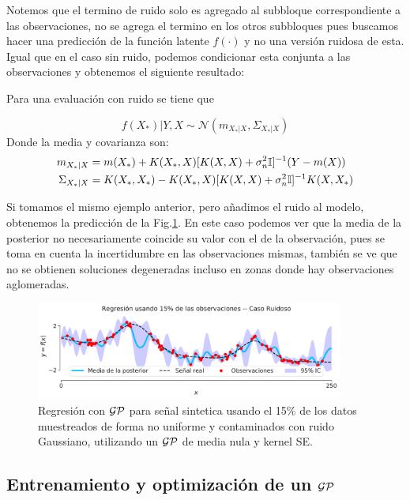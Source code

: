 Notemos que el termino de ruido solo es agregado al subbloque correspondiente a las observaciones, no se agrega el termino en los otros subbloques pues buscamos hacer una predicción de la función latente $f(\cdot)$ y no una versión ruidosa de esta.
Igual que en el caso sin ruido, podemos condicionar esta conjunta a las observaciones y obtenemos el siguiente resultado:

\begin{lemma}
	Para una evaluación con ruido se tiene que
	
	\begin{equation}
		f(X_*)|Y, X  \sim \mathcal{N}(m_{X_*|X}, \Sigma_{X_*|X})\label{eq:gp_posterior}
	\end{equation}
	Donde la media y covarianza son:
	\begin{align}
		m_{X_*|X} & = m(X_*) + K(X_*, X) [K(X, X) + \sigma_n^2 {\mathbb I}]^{-1} (Y - m(X))\\
	 \Sigma_{X_*|X} & = K(X_*, X_*) - K(X_*, X) [K(X, X) + \sigma_n^2 {\mathbb I}]^{-1} K(X, X_*)
	\end{align}
\end{lemma}

Si tomamos el mismo ejemplo anterior, pero añadimos el ruido al modelo, obtenemos la predicción de la Fig.\ref{fig:gp_3}. En este caso podemos ver que la media de la posterior no necesariamente coincide su valor con el de la observación, pues se toma en cuenta la incertidumbre en las observaciones mismas, también se ve que no se obtienen soluciones degeneradas incluso en zonas donde hay observaciones aglomeradas.


\begin{figure}[H]
	\centering
	\includegraphics[width=0.9\textwidth]{img/cap8_posterior_ruido}
	\caption{Regresión con $\mathcal{GP}$ para señal sintetica usando el 15$\%$ de los datos muestreados de forma no uniforme y contaminados con ruido Gaussiano, utilizando un $\mathcal{GP}$ de media nula y kernel SE.}
	\label{fig:gp_3}
\end{figure}

\subsection{Entrenamiento y optimización de un \texorpdfstring{$\mathcal{GP}$}{GP}}

